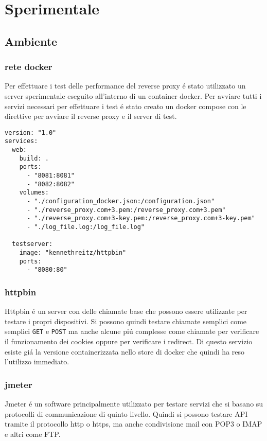 \chapter{Sperimentale}
\label{cha:Sperimentale}

\section{Ambiente}
\subsection{rete docker}
Per effettuare i test delle performance del reverse proxy é stato utilizzato un server sperimentale eseguito all'interno di un container docker. Per avviare tutti i servizi necessari per effettuare i test é stato creato un docker compose con le direttive per avviare il reverse proxy e il server di test.

\begin{lstlisting}[language=DockerCompose]
version: "1.0"
services:
  web:
    build: .
    ports:
      - "8081:8081"
      - "8082:8082"
    volumes:
      - "./configuration_docker.json:/configuration.json"
      - "./reverse_proxy.com+3.pem:/reverse_proxy.com+3.pem"
      - "./reverse_proxy.com+3-key.pem:/reverse_proxy.com+3-key.pem"
      - "./log_file.log:/log_file.log"

  testserver:
    image: "kennethreitz/httpbin"
    ports:
      - "8080:80"
\end{lstlisting}

\subsection{httpbin}
\cite{httpbin}
Httpbin é un server con delle chiamate base che possono essere utilizzate per testare i propri dispositivi. Si possono quindi testare chiamate semplici come semplici \texttt{GET} e \texttt{POST} ma anche alcune piú complesse come chiamate per verificare il funzionamento dei cookies oppure per verificare i redirect. Di questo servizio esiste giá la versione containerizzata nello store di docker che quindi ha reso l'utilizzo immediato.

\subsection{jmeter}
\cite{jmeter}
Jmeter é un software principalmente utilizzato per testare servizi che si basano su protocolli di communicazione di quinto livello. Quindi si possono testare API tramite il protocollo http o https, ma anche condivisione mail con POP3 o IMAP e altri come FTP.

